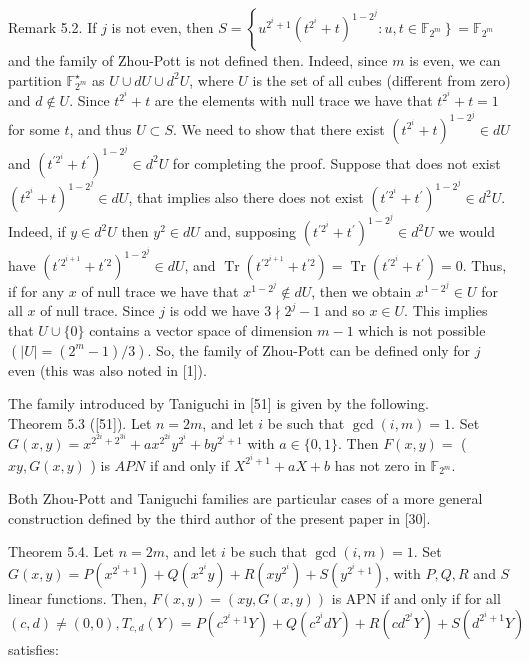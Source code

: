 \documentclass[10pt]{article}
\begin{document}
Remark 5.2. If $j$ is not even, then $S=\left\{u^{2^{i}+1}\left(t^{2^{i}}+t\right)^{1-2^{j}}: u, t \in\right. \left.\mathbb{F}_{2^{m}}\right\}=\mathbb{F}_{2^{m}}$ and the family of Zhou-Pott is not defined then. Indeed, since $m$ is even, we can partition $\mathbb{F}_{2^{m}}^{\star}$ as $U \cup d U \cup d^{2} U$, where $U$ is the set of all cubes (different from zero) and $d \notin U$. Since $t^{2^{i}}+t$ are the elements with null trace we have that $t^{2^{i}}+t=1$ for some $t$, and thus $U \subset S$. We need to show that there exist $\left(t^{2^{i}}+t\right)^{1-2^{j}} \in d U$ and $\left(t^{\prime 2^{i}}+t^{\prime}\right)^{1-2^{j}} \in d^{2} U$ for completing the proof. Suppose that does not exist $\left(t^{2^{i}}+t\right)^{1-2^{j}} \in d U$, that implies also there does not exist $\left(t^{\prime 2^{i}}+t^{\prime}\right)^{1-2^{j}} \in d^{2} U$. Indeed, if $y \in d^{2} U$ then $y^{2} \in d U$ and, supposing $\left(t^{\prime 2^{i}}+t^{\prime}\right)^{1-2^{j}} \in d^{2} U$ we would have $\left(t^{\prime 2^{i+1}}+t^{\prime 2}\right)^{1-2^{j}} \in d U$, and $\operatorname{Tr}\left(t^{\prime 2^{i+1}}+t^{\prime 2}\right)=\operatorname{Tr}\left(t^{\prime 2^{i}}+t^{\prime}\right)=0$. Thus, if for any $x$ of null trace we have that $x^{1-2^{j}} \notin d U$, then we obtain $x^{1-2^{j}} \in U$ for all $x$ of null trace. Since $j$ is odd we have $3 \nmid 2^{j}-1$ and so $x \in U$. This implies that $U \cup\{0\}$ contains a vector space of dimension $m-1$ which is not possible $\left(|U|=\left(2^{m}-1\right) / 3\right)$. So, the family of Zhou-Pott can be defined only for $j$ even (this was also noted in [1]).

The family introduced by Taniguchi in [51] is given by the following.\\[0pt]
Theorem 5.3 ([51]). Let $n=2 m$, and let $i$ be such that $\operatorname{gcd}(i, m)=1$. Set $G(x, y)=x^{2^{2 i}+2^{3 i}}+a x^{2^{2 i}} y^{2^{i}}+b y^{2^{i}+1}$ with $a \in\{0,1\}$. Then $F(x, y)=$ ( $x y, G(x, y)$ ) is $A P N$ if and only if $X^{2^{i}+1}+a X+b$ has not zero in $\mathbb{F}_{2^{m}}$.

Both Zhou-Pott and Taniguchi families are particular cases of a more general construction defined by the third author of the present paper in [30].

Theorem 5.4. Let $n=2 m$, and let $i$ be such that $\operatorname{gcd}(i, m)=1$. Set $G(x, y)=P\left(x^{2^{i}+1}\right)+Q\left(x^{2^{i}} y\right)+R\left(x y^{2^{i}}\right)+S\left(y^{2^{i}+1}\right)$, with $P, Q, R$ and $S$ linear functions. Then, $F(x, y)=(x y, G(x, y))$ is APN if and only if for all $(c, d) \neq (0,0), T_{c, d}(Y)=P\left(c^{2^{i}+1} Y\right)+Q\left(c^{2^{i}} d Y\right)+R\left(c d^{2^{i}} Y\right)+S\left(d^{2^{i}+1} Y\right)$ satisfies:
\end{document}
